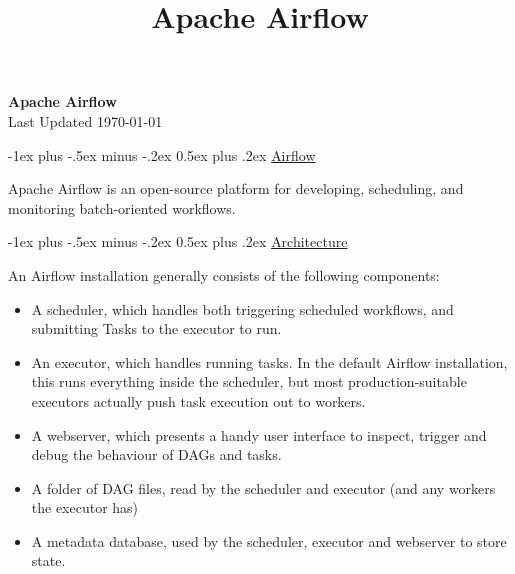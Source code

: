 \documentclass[10pt,landscape]{article}
\title{Apache Airflow}
\makeatletter
\renewcommand{\section}{\@startsection{section}{1}{0mm}%
                                {-1ex plus -.5ex minus -.2ex}%
                                {0.5ex plus .2ex}%
                                {\normalfont\large\bfseries}}
\makeatother
\begin{document}
\raggedright
\footnotesize

\begin{center}
    \vspace{-50mm}
    \Large{\vspace{-15mm}\textbf{Apache Airflow}} \\
    \footnotesize{Last Updated \today}
    \vspace{-.4mm}
\end{center}
\begin{multicols*}{3}
    \setlength{\premulticols}{1pt}
    \setlength{\postmulticols}{1pt}
    \setlength{\multicolsep}{1pt}
    \setlength{\columnsep}{2pt}
    \section{\underline{Airflow}}
    
    Apache Airflow is an open-source platform for developing, scheduling, and monitoring batch-oriented workflows.

    \section{\underline{Architecture}}
    
    An Airflow installation generally consists of the following components:

    \begin{itemize}[label={--},leftmargin=4mm]
        \vspace{-1mm}
        \itemsep -.4mm
        \item A scheduler, which handles both triggering scheduled workflows, and submitting Tasks to the executor to run.
        \item An executor, which handles running tasks. In the default Airflow installation, this runs everything inside the scheduler, but most production-suitable executors actually push task execution out to workers.
        \item A webserver, which presents a handy user interface to inspect, trigger and debug the behaviour of DAGs and tasks.
        \item A folder of DAG files, read by the scheduler and executor (and any workers the executor has)
        \item A metadata database, used by the scheduler, executor and webserver to store state.
    \end{itemize}



\end{multicols*}
\end{document}
